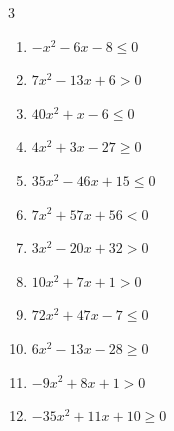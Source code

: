 \begin{multicols}{3}
\begin{enumerate}

  \item $-x^{2}-6x-8\leq 0$

        \phantom{$\displaystyle x \leqq -4 , \; -2 \leqq x$}

  \item $7x^{2}-13x+6>0$


  \item $40x^{2}+x-6\leq 0$


  \item $4x^{2}+3x-27\geq 0$


  \item $35x^{2}-46x+15\leq 0$


  \item $7x^{2}+57x+56<0$


  \item $3x^{2}-20x+32>0$


\columnbreak %

  \item $10x^{2}+7x+1>0$


  \item $72x^{2}+47x-7\leq 0$


  \item $6x^{2}-13x-28\geq 0$


  \item $-9x^{2}+8x+1>0$


  \item $-35x^{2}+11x+10\geq 0$


\end{enumerate}
\end{multicols}
